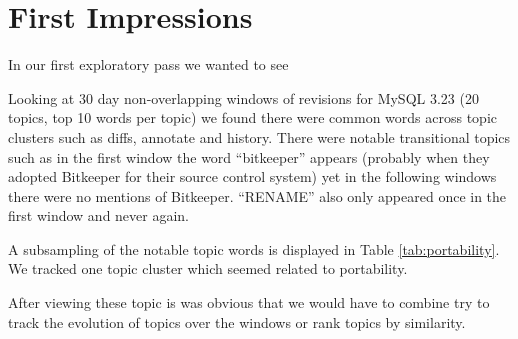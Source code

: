 \documentclass[times, 10pt,twocolumn]{article}
\begin{document}







\section{First Impressions}

In our first exploratory pass we wanted to see 

Looking at 30 day non-overlapping windows of revisions for MySQL 3.23
(20 topics, top 10 words per topic) we found there were common words
across topic clusters such as diffs, annotate and history. There were
notable transitional topics such as in the first window the word
``bitkeeper'' appears (probably when they adopted Bitkeeper for their
source control system) yet in the following windows there were no
mentions of Bitkeeper. ``RENAME'' also only appeared once in the first
window and never again.

A subsampling of the notable topic words is displayed in Table
\ref{tab:portability}. We tracked one topic cluster which seemed
related to portability.


After viewing these topic is was obvious that we would have to combine
try to track the evolution of topics over the windows or rank topics
by similarity.

\end{document}
